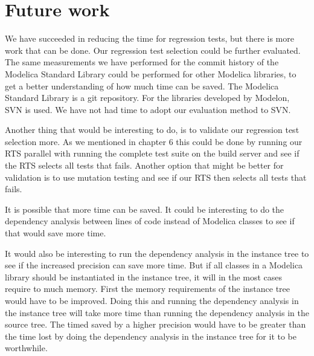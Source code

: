 \documentclass{cslthse-msc}
\begin{document}
\section{Future work}
We have succeeded in reducing the time for regression tests, but there is more work that can be done. Our regression test selection could be further evaluated. The same measurements we have performed for the commit history of the Modelica Standard Library could be performed for other Modelica libraries, to get a better understanding of how much time can be saved. The Modelica Standard Library is a git repository. For the libraries developed by Modelon, SVN is used. We have not had time to adopt our evaluation method to SVN.

Another thing that would be interesting to do, is to validate our regression test selection more. As we mentioned in chapter 6 this could be done by running our RTS parallel with running the complete test suite on the build server and see if the RTS selects all tests that fails. Another option that might be better for validation is to use mutation testing and see if our RTS then selects all tests that fails.

It is possible that more time can be saved. It could be interesting to do the dependency analysis between lines of code instead of Modelica classes to see if that would save more time.

It would also be interesting to run the dependency analysis in the instance tree to see if the increased precision can save more time. But if all classes in a Modelica library should be instantiated in the instance tree, it will in the most cases require to much memory. First the memory requirements of the instance tree would have to be improved. Doing this and running the dependency analysis in the instance tree will take more time than running the dependency analysis in the source tree. The timed saved by a higher precision would have to be greater than the time lost by doing the dependency analysis in the instance tree for it to be worthwhile.

\printbibliography[heading=bibintoc]

\end{document}
